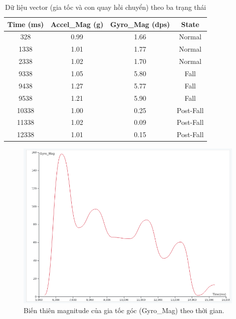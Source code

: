 \begin{table}[H]
\centering
\caption{Dữ liệu vector (gia tốc và con quay hồi chuyển) theo ba trạng thái}
\label{tab:vector_data}
\begin{tabular}{|c|c|c|c|}
\hline
\textbf{Time (ms)} & \textbf{Accel\_Mag (g)} & \textbf{Gyro\_Mag (dps)} & \textbf{State} \\
\hline
328   & 0.99 & 1.66 & Normal \\
1338  & 1.01 & 1.77 & Normal \\
2338  & 1.02 & 1.70 & Normal \\
9338  & 1.05 & 5.80 & Fall \\
9438  & 1.27 & 5.77 & Fall \\
9538  & 1.21 & 5.90 & Fall \\
10338 & 1.00 & 0.25 & Post-Fall \\
11338 & 1.02 & 0.09 & Post-Fall \\
12338 & 1.01 & 0.15 & Post-Fall \\
\hline
\end{tabular}
\end{table}

\begin{figure}[H]
    \centering
    \includegraphics[width=0.95\linewidth]{figures/gyro_time.png}
    \caption{Biến thiên magnitude của gia tốc góc (Gyro\_Mag) theo thời gian.}
    \label{fig:gyro_time}
\end{figure}

